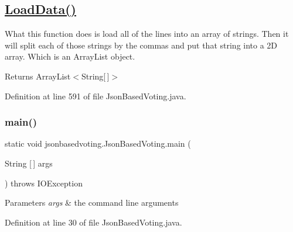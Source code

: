 \subsection*{\mbox{\hyperlink{classjsonbasedvoting_1_1_json_based_voting_adbcb2c2a084932df90996c7199251579}{Load\+Data()}}}

What this function does is load all of the lines into an array of strings. Then it will split each of those strings by the commas and put that string into a 2D array. Which is an Array\+List object. \begin{DoxyReturn}{Returns}
Array\+List$<$\+String\mbox{[}$\,$\mbox{]}$>$ 
\end{DoxyReturn}


Definition at line 591 of file Json\+Based\+Voting.\+java.

\mbox{\label{classjsonbasedvoting_1_1_json_based_voting_a39d87f4c78499d4c595529d34b656f82}} 
\subsubsection{\texorpdfstring{main()}{main()}}
{\footnotesize\ttfamily static void jsonbasedvoting.\+Json\+Based\+Voting.\+main (\begin{DoxyParamCaption}\item[{String \mbox{[}$\,$\mbox{]}}]{args }\end{DoxyParamCaption}) throws I\+O\+Exception\hspace{0.3cm}{\ttfamily [static]}}


\begin{DoxyParams}{Parameters}
{\em args} & the command line arguments \\
\hline
\end{DoxyParams}


Definition at line 30 of file Json\+Based\+Voting.\+java.

\mbox{\label{classjsonbasedvoting_1_1_json_based_voting_a6710604aec057cdca50e794f8f3faaee}} 
